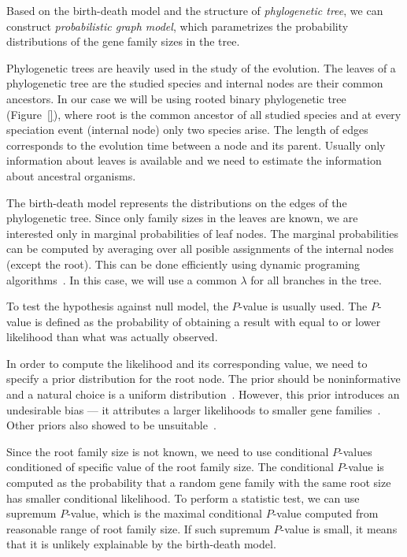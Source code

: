 Based on the birth-death model and the structure of \emph{phylogenetic tree}, we can construct \emph{probabilistic graph model}, which parametrizes the probability distributions of the gene family sizes in the tree.

Phylogenetic trees are heavily used in the study of the evolution. The leaves of a phylogenetic tree are the studied species and internal nodes are their common ancestors. In our case we will be using rooted binary phylogenetic tree (Figure~\ref{}), where root is the common ancestor of all studied species and at every speciation event (internal node) only two species arise. The length of edges corresponds to the evolution time between a node and its parent. Usually only information about leaves is available and we need to estimate the information about ancestral organisms.

The birth-death model represents the distributions on the edges of the phylogenetic tree. Since only family sizes in the leaves are known, we are interested only in marginal probabilities of leaf nodes. The marginal probabilities can be computed by averaging over all posible assignments of the internal nodes (except the root). This can be done efficiently using dynamic programing algorithms~\cite{felsenstein1981evolutionary}. In this case, we will use a common $\lambda$ for all branches in the tree.

To test the hypothesis against null model, the $P$-value is usually used. The $P$-value is defined as the probability of obtaining a result with equal to or lower likelihood than what was actually observed.

In order to compute the likelihood and its corresponding value, we need to specify a prior distribution for the root node. The prior should be noninformative and a natural choice is a uniform distribution~\cite{felsenstein1981evolutionary}. However, this prior introduces an undesirable bias --- it attributes a larger likelihoods to smaller gene families~\cite{hahn2005estimating}. Other priors also showed to be unsuitable~\cite{hahn2005estimating}.

Since the root family size is not known, we need to use conditional $P$-values conditioned of specific value of the root family size.
The conditional $P$-value is computed as the probability that a random gene family with the same root size has smaller conditional likelihood.
To perform a statistic test, we can use supremum $P$-value, which is the maximal conditional $P$-value computed from reasonable range of root family size.
If such supremum $P$-value is small, it means that it is unlikely explainable by the birth-death model.

